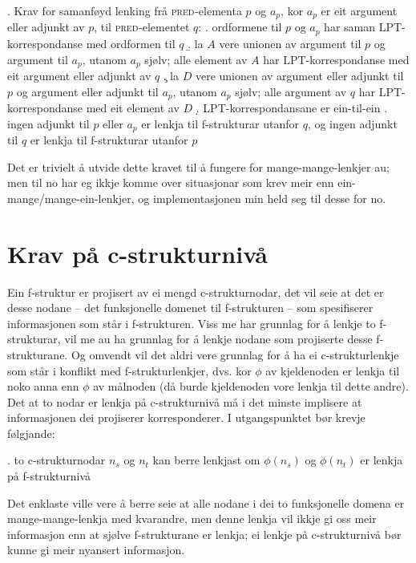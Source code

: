 \documentclass[12pt,a4paper,oneside,draft]{report}
\newcommand{\F}[2]{\textsc{#1}\ensuremath{_{#2}}}
\newcommand{\PRED}{\F{pred}{}}
\begin{document}
\ex. \label{krav:f-ein-mange} Krav for samanføyd lenking frå \PRED{}-elementa
$p$ og $a_p$, kor $a_p$ er eit argument eller adjunkt av $p$, til \PRED{}-elementet $q$:
\a. ordformene til $p$ og $a_p$ har saman LPT\hyp{}korrespondanse med ordformen til $q$
\b. la $A$ vere unionen av argument til $p$ og argument til $a_p$,
    utanom $a_p$ sjølv;
    alle element av $A$ har LPT\hyp{}korrespondanse med eit argument eller adjunkt av $q$
\c. la $D$ vere unionen av argument eller adjunkt til $p$ og argument
    eller adjunkt til $a_p$, utanom $a_p$ sjølv;
    alle argument av $q$ har LPT\hyp{}korrespondanse med eit element av $D$
\d. LPT\hyp{}korrespondansane er ein-til-ein
\e. ingen adjunkt til $p$ eller $a_p$ er lenkja til f\hyp{}strukturar utanfor $q$, og ingen
    adjunkt til $q$ er lenkja til f\hyp{}strukturar utanfor $p$

Det er trivielt å utvide dette kravet til å fungere for
mange-mange-lenkjer au; men til no har eg ikkje komme over situasjonar
som krev meir enn ein-mange/mange-ein-lenkjer, og implementasjonen min
held seg til desse for no.

\section{Krav på c\hyp{}strukturnivå}
\label{sec-3.7}

\label{SEC:subnode}

Ein f\hyp{}struktur er projisert av ei mengd c\hyp{}strukturnodar, det vil seie
at det er desse nodane -- det funksjonelle domenet til f\hyp{}strukturen --
som spesifiserer informasjonen som står i f\hyp{}strukturen. Viss me har
grunnlag for å lenkje to f\hyp{}strukturar, vil me au ha grunnlag for å
lenkje nodane som projiserte desse f\hyp{}strukturane. Og omvendt vil det
aldri vere grunnlag for å ha ei c\hyp{}strukturlenkje som står i konflikt
med f\hyp{}strukturlenkjer, dvs. kor $\phi$ av kjeldenoden er lenkja til
noko anna enn $\phi$ av målnoden (då burde kjeldenoden vore lenkja til
dette andre). Det at to nodar er lenkja på c\hyp{}strukturnivå må i det
minste implisere at informasjonen dei projiserer korresponderer. I
utgangspunktet bør krevje følgjande:

\ex.\label{krav:subnode-f-lenkja} to c\hyp{}strukturnodar $n_s$ og $n_t$ kan
     berre lenkjast om $\phi(n_s)$ og $\phi(n_t)$ er lenkja på
     f\hyp{}strukturnivå

Det enklaste ville vere å berre seie at alle nodane i dei to
funksjonelle domena er mange-mange-lenkja med kvarandre, men denne
lenkja vil ikkje gi oss meir informasjon enn at sjølve f\hyp{}strukturane
er lenkja; ei lenkje på c\hyp{}strukturnivå bør kunne gi meir nyansert
informasjon.
\end{document}
